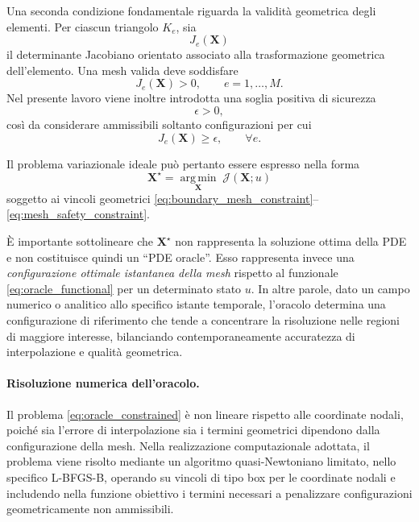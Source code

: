 Una seconda condizione fondamentale riguarda la validità geometrica degli elementi. Per ciascun triangolo $K_e$, sia
\[
J_e(\mathbf{X})
\]
il determinante Jacobiano orientato associato alla trasformazione geometrica dell'elemento. Una mesh valida deve soddisfare
\begin{equation}
J_e(\mathbf{X})>0,
\qquad
e=1,\ldots,M.
\label{eq:mesh_validity_oracle}
\end{equation}
Nel presente lavoro viene inoltre introdotta una soglia positiva di sicurezza
\[
\epsilon>0,
\]
così da considerare ammissibili soltanto configurazioni per cui
\begin{equation}
J_e(\mathbf{X})\geq\epsilon,
\qquad
\forall e.
\label{eq:mesh_safety_constraint}
\end{equation}

Il problema variazionale ideale può pertanto essere espresso nella forma
\begin{equation}
\mathbf{X}^{\star}
=
\underset{\mathbf{X}}{\operatorname{arg\,min}}
\;
\mathcal{J}(\mathbf{X};u)
\label{eq:oracle_constrained}
\end{equation}
soggetto ai vincoli geometrici \eqref{eq:boundary_mesh_constraint}--\eqref{eq:mesh_safety_constraint}.

È importante sottolineare che $\mathbf{X}^{\star}$ non rappresenta la soluzione ottima della PDE e non costituisce quindi un ``PDE oracle''. Esso rappresenta invece una \textit{configurazione ottimale istantanea della mesh} rispetto al funzionale \eqref{eq:oracle_functional} per un determinato stato $u$. In altre parole, dato un campo numerico o analitico allo specifico istante temporale, l'oracolo determina una configurazione di riferimento che tende a concentrare la risoluzione nelle regioni di maggiore interesse, bilanciando contemporaneamente accuratezza di interpolazione e qualità geometrica.

\paragraph{Risoluzione numerica dell'oracolo.}

Il problema \eqref{eq:oracle_constrained} è non lineare rispetto alle coordinate nodali, poiché sia l'errore di interpolazione sia i termini geometrici dipendono dalla configurazione della mesh. Nella realizzazione computazionale adottata, il problema viene risolto mediante un algoritmo quasi-Newtoniano limitato, nello specifico L-BFGS-B, operando su vincoli di tipo box per le coordinate nodali e includendo nella funzione obiettivo i termini necessari a penalizzare configurazioni geometricamente non ammissibili.

